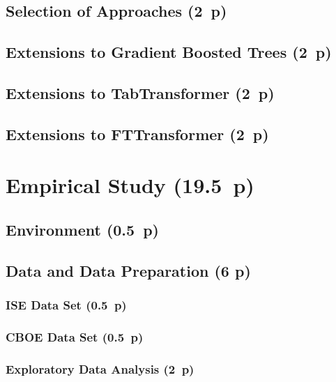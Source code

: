 \subsection{Selection of Approaches (2~p)}\label{sec:selection-of-approaches-1}

\subsection{Extensions to Gradient Boosted
  Trees (2~p)}\label{sec:extensions-to-gradient-boosted-trees}

\subsection{Extensions to TabTransformer (2~p)}\label{sec:extensions-to-tabtransformer}

\subsection{Extensions to FTTransformer (2~p)}\label{sec:extensions-to-fttransformer}


\newpage
\section{Empirical Study (19.5~p)}\label{sec:empirical-study}

\subsection{Environment (0.5~p)}\label{sec:environment}

\subsection{Data and Data Preparation (6 p)}\label{sec:data-and-data-preparation}

\subsubsection{ISE Data Set (0.5~p)}\label{sec:ise-data-set}

\subsubsection{CBOE Data Set (0.5~p)}\label{sec:cboe-data-set}

\subsubsection{Exploratory Data Analysis (2~p)}\label{sec:exploratory-data-analysis}

